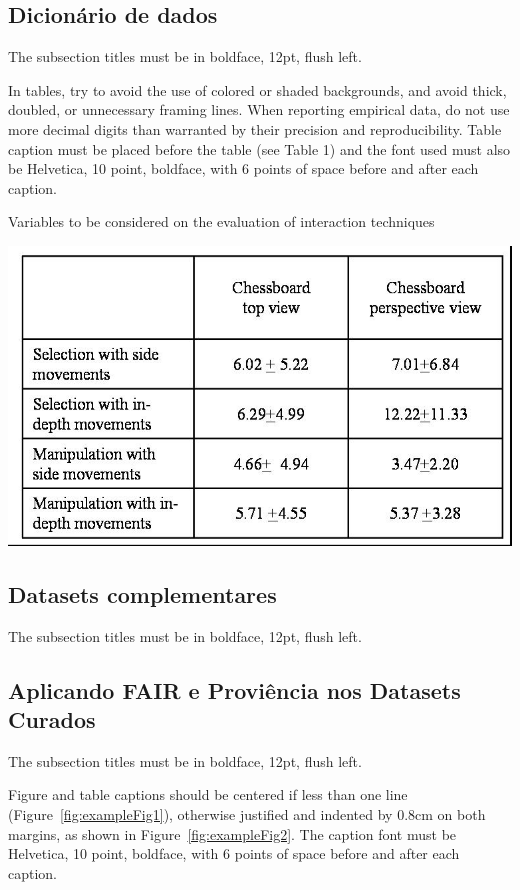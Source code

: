 \documentclass[12pt]{article}
\begin{document}
\subsection{Dicionário de dados}

The subsection titles must be in boldface, 12pt, flush left.

In tables, try to avoid the use of colored or shaded backgrounds, and avoid
thick, doubled, or unnecessary framing lines. When reporting empirical data,
do not use more decimal digits than warranted by their precision and
reproducibility. Table caption must be placed before the table (see Table 1)
and the font used must also be Helvetica, 10 point, boldface, with 6 points of
space before and after each caption.

\begin{table}[ht]
\centering
\caption{Variables to be considered on the evaluation of interaction
  techniques}
\label{tab:exTable1}
\includegraphics[width=.7\textwidth]{table.jpg}
\end{table}

\subsection{Datasets complementares}

The subsection titles must be in boldface, 12pt, flush left.

\subsection{Aplicando FAIR e Proviência nos Datasets Curados}

The subsection titles must be in boldface, 12pt, flush left.

Figure and table captions should be centered if less than one line
(Figure~\ref{fig:exampleFig1}), otherwise justified and indented by 0.8cm on
both margins, as shown in Figure~\ref{fig:exampleFig2}. The caption font must
be Helvetica, 10 point, boldface, with 6 points of space before and after each
caption.
\end{document}
